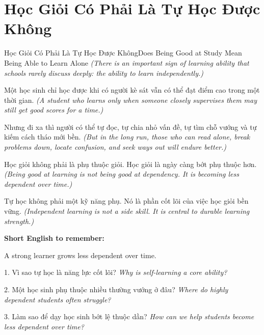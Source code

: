 \section{Học Giỏi Có Phải Là Tự Học Được Không}
\begin{truyen}{Học Giỏi Có Phải Là Tự Học Được Không}{Does Being Good at Study Mean Being Able to Learn Alone}
\textit{(There is an important sign of learning ability that schools rarely discuss deeply: the ability to learn independently.)}

Một học sinh chỉ học được khi có người kè sát vẫn có thể đạt điểm cao trong một thời gian.
\textit{(A student who learns only when someone closely supervises them may still get good scores for a time.)}

Nhưng đi xa thì người có thể tự đọc, tự chia nhỏ vấn đề, tự tìm chỗ vướng và tự kiếm cách tháo mới bền.
\textit{(But in the long run, those who can read alone, break problems down, locate confusion, and seek ways out will endure better.)}

Học giỏi không phải là phụ thuộc giỏi. Học giỏi là ngày càng bớt phụ thuộc hơn.
\textit{(Being good at learning is not being good at dependency. It is becoming less dependent over time.)}
\end{truyen}

\begin{baihoc}
Tự học không phải một kỹ năng phụ. Nó là phần cốt lõi của việc học giỏi bền vững.
\textit{(Independent learning is not a side skill. It is central to durable learning strength.)}
\end{baihoc}

\begin{ghinhoanh}
\textbf{Short English to remember:}

A strong learner grows less dependent over time.

\end{ghinhoanh}

\begin{tuhocnhanh}
1. Vì sao tự học là năng lực cốt lõi? \textit{Why is self-learning a core ability?}

2. Một học sinh phụ thuộc nhiều thường vướng ở đâu? \textit{Where do highly dependent students often struggle?}

3. Làm sao để dạy học sinh bớt lệ thuộc dần? \textit{How can we help students become less dependent over time?}
\end{tuhocnhanh}
\ngancach

